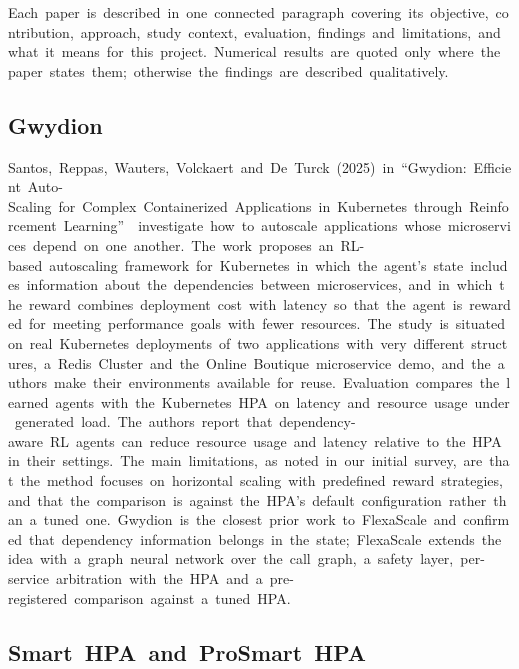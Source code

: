 \documentclass[12pt,a4paper,oneside]{report}
\begin{document}
Each~paper~is~described~in~one~connected~paragraph~covering~its~objective,~contribution,~approach,~study~context,~evaluation,~findings~and~limitations,~and~what~it~means~for~this~project.~Numerical~results~are~quoted~only~where~the~paper~states~them;~otherwise~the~findings~are~described~qualitatively.


\subsection{Gwydion}

Santos,~Reppas,~Wauters,~Volckaert~and~De~Turck~(2025)~in~``Gwydion:~Efficient~Auto-Scaling~for~Complex~Containerized~Applications~in~Kubernetes~through~Reinforcement~Learning''~\cite{gwydion}~investigate~how~to~autoscale~applications~whose~microservices~depend~on~one~another.~The~work~proposes~an~RL-based~autoscaling~framework~for~Kubernetes~in~which~the~agent's~state~includes~information~about~the~dependencies~between~microservices,~and~in~which~the~reward~combines~deployment~cost~with~latency~so~that~the~agent~is~rewarded~for~meeting~performance~goals~with~fewer~resources.~The~study~is~situated~on~real~Kubernetes~deployments~of~two~applications~with~very~different~structures,~a~Redis~Cluster~and~the~Online~Boutique~microservice~demo,~and~the~authors~make~their~environments~available~for~reuse.~Evaluation~compares~the~learned~agents~with~the~Kubernetes~HPA~on~latency~and~resource~usage~under~generated~load.~The~authors~report~that~dependency-aware~RL~agents~can~reduce~resource~usage~and~latency~relative~to~the~HPA~in~their~settings.~The~main~limitations,~as~noted~in~our~initial~survey,~are~that~the~method~focuses~on~horizontal~scaling~with~predefined~reward~strategies,~and~that~the~comparison~is~against~the~HPA's~default~configuration~rather~than~a~tuned~one.~Gwydion~is~the~closest~prior~work~to~FlexaScale~and~confirmed~that~dependency~information~belongs~in~the~state;~FlexaScale~extends~the~idea~with~a~graph~neural~network~over~the~call~graph,~a~safety~layer,~per-service~arbitration~with~the~HPA~and~a~pre-registered~comparison~against~a~tuned~HPA.


\subsection{Smart~HPA~and~ProSmart~HPA}
\end{document}
